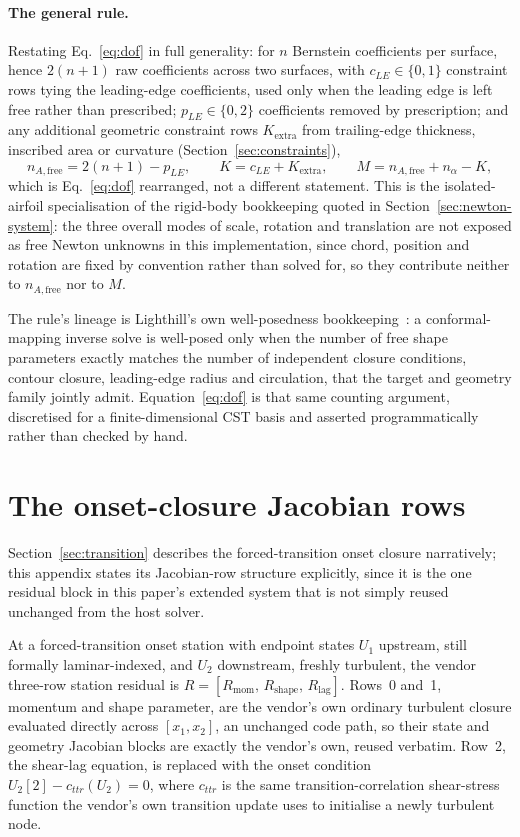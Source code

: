 \paragraph{The general rule.} Restating Eq.~\eqref{eq:dof} in full generality:
for $n$ Bernstein coefficients per surface, hence $2(n+1)$ raw coefficients
across two surfaces, with $c_{LE}\in\{0,1\}$ constraint rows tying the
leading-edge coefficients, used only when the leading edge is left free rather
than prescribed; $p_{LE}\in\{0,2\}$ coefficients removed by prescription; and
any additional geometric constraint rows $K_{\text{extra}}$ from
trailing-edge thickness, inscribed area or curvature
(Section~\ref{sec:constraints}),
\begin{equation}
  n_{A,\text{free}} = 2(n+1) - p_{LE}, \qquad K = c_{LE} + K_{\text{extra}},
  \qquad M = n_{A,\text{free}} + n_\alpha - K,
\end{equation}
which is Eq.~\eqref{eq:dof} rearranged, not a different statement. This is the
isolated-airfoil specialisation of the rigid-body bookkeeping quoted in
Section~\ref{sec:newton-system}: the three overall modes of scale, rotation
and translation are not exposed as free Newton unknowns in this
implementation, since chord, position and rotation are fixed by convention
rather than solved for, so they contribute neither to $n_{A,\text{free}}$ nor
to $M$.

The rule's lineage is Lighthill's own well-posedness
bookkeeping~\citep{lighthill1945new}: a conformal-mapping inverse solve is
well-posed only when the number of free shape parameters exactly matches the
number of independent closure conditions, contour closure, leading-edge radius
and circulation, that the target and geometry family jointly admit.
Equation~\eqref{eq:dof} is that same counting argument, discretised for a
finite-dimensional CST basis and asserted programmatically rather than checked
by hand.

\section{The onset-closure Jacobian rows}
\label{app:onset}

Section~\ref{sec:transition} describes the forced-transition onset closure
narratively; this appendix states its Jacobian-row structure explicitly, since
it is the one residual block in this paper's extended system that is not
simply reused unchanged from the host solver.

At a forced-transition onset station with endpoint states $U_1$ upstream,
still formally laminar-indexed, and $U_2$ downstream, freshly turbulent, the
vendor three-row station residual is
$R=[R_{\text{mom}},\,R_{\text{shape}},\,R_{\text{lag}}]$. Rows~0 and~1,
momentum and shape parameter, are the vendor's own ordinary turbulent closure
evaluated directly across $[x_1,x_2]$, an unchanged code path, so their state
and geometry Jacobian blocks are exactly the vendor's own, reused verbatim.
Row~2, the shear-lag equation, is replaced with the onset condition
$U_2[2] - c_{ttr}(U_2) = 0$, where $c_{ttr}$ is the same transition-correlation
shear-stress function the vendor's own transition update uses to initialise a
newly turbulent node.

